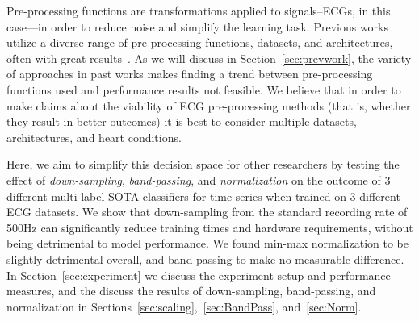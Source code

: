\documentclass[pmlr,twocolumn]{jmlr}%
\begin{document}
 Pre-processing functions are transformations applied to signals--ECGs, in this case---in order to reduce noise and simplify the learning task. Previous works utilize a diverse range of pre-processing functions, datasets, and architectures, often with great results~\citep{hong2022practical}. As we will discuss in Section~\ref{sec:prevwork}, the variety of approaches in past works makes finding a trend between pre-processing functions used and performance results not feasible. We believe that in order to make claims about the viability of ECG pre-processing methods (that is, whether they result in better outcomes) it is best to consider multiple datasets, architectures, and heart conditions.  


Here, we aim to simplify this decision space for other researchers by testing the effect of \textit{down-sampling}, \textit{band-passing}, and \textit{normalization} on the outcome of 3 different multi-label SOTA classifiers for time-series when trained on 3 different ECG datasets. We show that down-sampling from the standard recording rate of 500Hz can significantly reduce training times and hardware requirements, without being detrimental to model performance.  We found min-max normalization to be slightly detrimental overall, and band-passing to make no measurable difference. In Section~\ref{sec:experiment} we discuss the experiment setup and performance measures, and the discuss the results of down-sampling, band-passing, and normalization in Sections~\ref{sec:scaling},~\ref{sec:BandPass}, and~\ref{sec:Norm}. 


\begin{table}[htbp]
\label{tab:top5}
{\caption{Functions used by Top 5 teams in Physionet2020~\citep{hong2022practical}}}%
    
    { 
}
\end{table}
\end{document}
